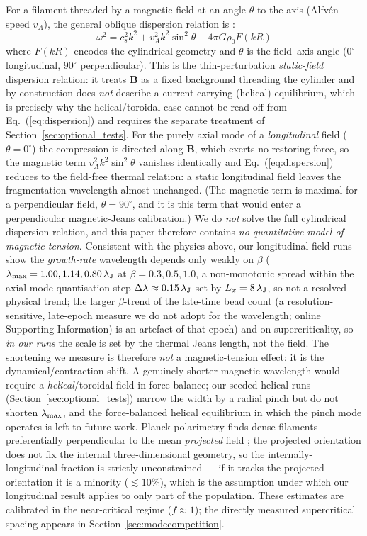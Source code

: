 \documentclass[usenatbib,twoside,twocolumn]{mnras}
\begin{document}
For a filament threaded by a magnetic field at an angle $\theta$ to the axis (Alfv\'en speed $v_A$), the general oblique dispersion relation is \citep{Nakamura1993}:
\begin{equation}
\omega^2 = c_s^2 k^2 + v_A^2 k^2 \sin^2\theta - 4\pi G\rho_0 F(kR)
\label{eq:dispersion}
\end{equation}
where $F(kR)$ encodes the cylindrical geometry and $\theta$ is the field--axis angle ($0^\circ$ longitudinal, $90^\circ$ perpendicular). This is the thin-perturbation \emph{static-field} dispersion relation: it treats $\mathbf{B}$ as a fixed background threading the cylinder and by construction does \emph{not} describe a current-carrying (helical) equilibrium, which is precisely why the helical/toroidal case cannot be read off from Eq.~(\ref{eq:dispersion}) and requires the separate treatment of Section~\ref{sec:optional_tests}. For the purely axial mode of a \emph{longitudinal} field ($\theta=0^\circ$) the compression is directed along $\mathbf{B}$, which exerts no restoring force, so the magnetic term $v_A^2k^2\sin^2\theta$ vanishes identically and Eq.~(\ref{eq:dispersion}) reduces to the field-free thermal relation: a static longitudinal field leaves the fragmentation wavelength almost unchanged. (The magnetic term is maximal for a perpendicular field, $\theta=90^\circ$, and it is this term that would enter a perpendicular magnetic-Jeans calibration.) We do \emph{not} solve the full cylindrical dispersion relation, and this paper therefore contains \emph{no quantitative model of magnetic tension}. Consistent with the physics above, our longitudinal-field runs show the \emph{growth-rate} wavelength depends only weakly on $\beta$ ($\lambda_{\rm max}=1.00,1.14,0.80\,\lambda_{\rm J}$ at $\beta=0.3,0.5,1.0$, a non-monotonic spread within the axial mode-quantisation step $\Delta\lambda\approx0.15\,\lambda_{\rm J}$ set by $L_x=8\,\lambda_{\rm J}$, so not a resolved physical trend; the larger $\beta$-trend of the late-time bead count (a resolution-sensitive, late-epoch measure we do not adopt for the wavelength; online Supporting Information) is an artefact of that epoch) and on supercriticality, so \emph{in our runs} the scale is set by the thermal Jeans length, not the field. The shortening we measure is therefore \emph{not} a magnetic-tension effect: it is the dynamical/contraction shift. A genuinely shorter magnetic wavelength would require a \emph{helical}/toroidal field in force balance; our seeded helical runs (Section~\ref{sec:optional_tests}) narrow the width by a radial pinch but do not shorten $\lambda_{\rm max}$, and the force-balanced helical equilibrium in which the \citet{Fiege2000} pinch mode operates is left to future work. Planck polarimetry finds dense filaments preferentially perpendicular to the mean \emph{projected} field \citep{Jadhav2026}; the projected orientation does not fix the internal three-dimensional geometry, so the internally-longitudinal fraction is strictly unconstrained --- if it tracks the projected orientation it is a minority ($\lesssim10\%$), which is the assumption under which our longitudinal result applies to only part of the population. These estimates are calibrated in the near-critical regime ($f\approx1$); the directly measured supercritical spacing appears in Section~\ref{sec:modecompetition}.
\end{document}

